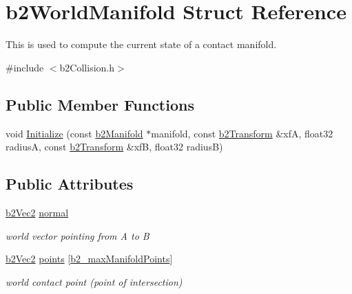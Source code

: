 \hypertarget{structb2_world_manifold}{\section{b2\-World\-Manifold Struct Reference}
\label{structb2_world_manifold}
}


This is used to compute the current state of a contact manifold.  




{\ttfamily \#include $<$b2\-Collision.\-h$>$}

\subsection*{Public Member Functions}
\begin{DoxyCompactItemize}
\item 
void \hyperlink{structb2_world_manifold_a896dd7e7d4d6f6a5bc69e19fbd6871bd}{Initialize} (const \hyperlink{structb2_manifold}{b2\-Manifold} $\ast$manifold, const \hyperlink{structb2_transform}{b2\-Transform} \&xf\-A, float32 radius\-A, const \hyperlink{structb2_transform}{b2\-Transform} \&xf\-B, float32 radius\-B)
\end{DoxyCompactItemize}
\subsection*{Public Attributes}
\begin{DoxyCompactItemize}
\item 
\hypertarget{structb2_world_manifold_acf8de61b73d9784d16f7d0e824ce44bf}{\hyperlink{structb2_vec2}{b2\-Vec2} \hyperlink{structb2_world_manifold_acf8de61b73d9784d16f7d0e824ce44bf}{normal}}\label{structb2_world_manifold_acf8de61b73d9784d16f7d0e824ce44bf}

\begin{DoxyCompactList}\small\item\em world vector pointing from A to B \end{DoxyCompactList}\item 
\hypertarget{structb2_world_manifold_af15e84b90f102c0ac433be2d63604021}{\hyperlink{structb2_vec2}{b2\-Vec2} \hyperlink{structb2_world_manifold_af15e84b90f102c0ac433be2d63604021}{points} \mbox{[}\hyperlink{b2_settings_8h_aa5f44cc9edf711433dea2b2ec94f3c42}{b2\-\_\-max\-Manifold\-Points}\mbox{]}}\label{structb2_world_manifold_af15e84b90f102c0ac433be2d63604021}

\begin{DoxyCompactList}\small\item\em world contact point (point of intersection) \end{DoxyCompactList}\end{DoxyCompactItemize}


